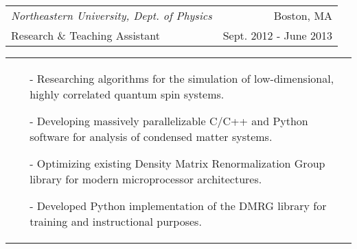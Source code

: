 \begin{tabularx}{\textwidth}{ L R }
  \textit{Northeastern University, Dept. of Physics} & Boston, MA \\
  Research \& Teaching Assistant & Sept. 2012 - June 2013 \\
\end{tabularx}
\begin{tabularx}{\textwidth}{ X }
  \begin{small}
  \begin{itemize}
    \itemsep{}
    \item[-] Researching algorithms for the simulation of low-dimensional, highly correlated quantum spin systems.
    \item[-] Developing massively parallelizable C/C++ and Python software for analysis of condensed matter systems.
    \item[-] Optimizing existing Density Matrix Renormalization Group library for modern microprocessor architectures.
    \item[-] Developed Python implementation of the DMRG library for training and instructional purposes.
  \end{itemize}
  \end{small}
\end{tabularx}
